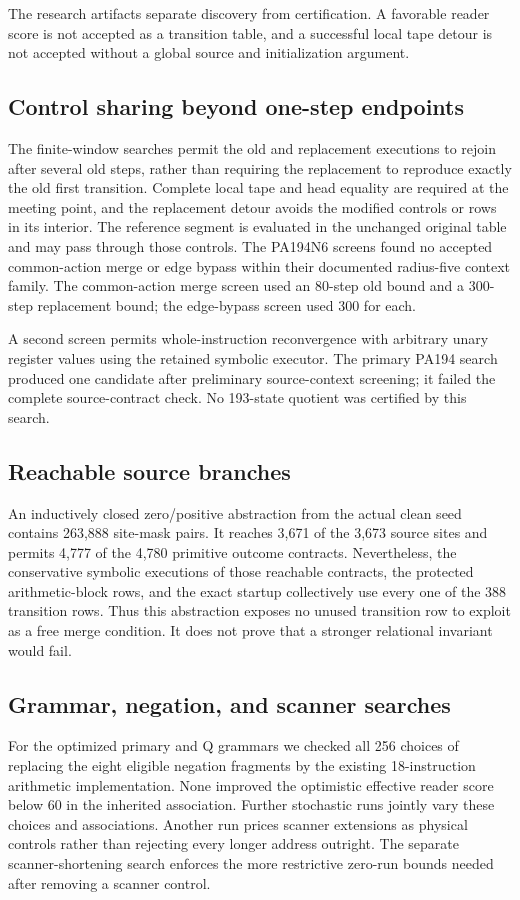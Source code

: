 The research artifacts separate discovery from certification. A favorable reader score is not accepted as a transition table, and a successful local tape detour is not accepted without a global source and initialization argument.

\subsection{Control sharing beyond one-step endpoints}
The finite-window searches permit the old and replacement executions to rejoin after several old steps, rather than requiring the replacement to reproduce exactly the old first transition. Complete local tape and head equality are required at the meeting point, and the replacement detour avoids the modified controls or rows in its interior. The reference segment is evaluated in the unchanged original table and may pass through those controls. The PA194N6 screens found no accepted common-action merge or edge bypass within their documented radius-five context family. The common-action merge screen used an 80-step old bound and a 300-step replacement bound; the edge-bypass screen used 300 for each.

A second screen permits whole-instruction reconvergence with arbitrary unary register values using the retained symbolic executor. The primary PA194 search produced one candidate after preliminary source-context screening; it failed the complete source-contract check. No 193-state quotient was certified by this search.

\subsection{Reachable source branches}
An inductively closed zero/positive abstraction from the actual clean seed contains 263,888 site-mask pairs. It reaches 3,671 of the 3,673 source sites and permits 4,777 of the 4,780 primitive outcome contracts. Nevertheless, the conservative symbolic executions of those reachable contracts, the protected arithmetic-block rows, and the exact startup collectively use every one of the 388 transition rows. Thus this abstraction exposes no unused transition row to exploit as a free merge condition. It does not prove that a stronger relational invariant would fail.

\subsection{Grammar, negation, and scanner searches}
For the optimized primary and Q grammars we checked all 256 choices of replacing the eight eligible negation fragments by the existing 18-instruction arithmetic implementation. None improved the optimistic effective reader score below 60 in the inherited association. Further stochastic runs jointly vary these choices and associations. Another run prices scanner extensions as physical controls rather than rejecting every longer address outright. The separate scanner-shortening search enforces the more restrictive zero-run bounds needed after removing a scanner control.

